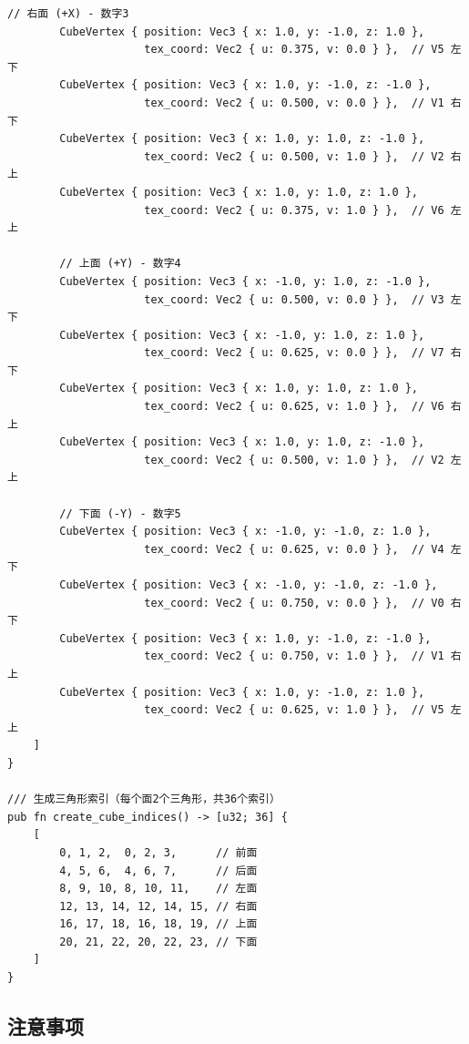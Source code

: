 \documentclass[12pt,a4paper]{article}
\begin{document}
\begin{lstlisting}[style=ruststyle, caption={正方体纹理坐标定义}]
        // 右面 (+X) - 数字3
        CubeVertex { position: Vec3 { x: 1.0, y: -1.0, z: 1.0 }, 
                     tex_coord: Vec2 { u: 0.375, v: 0.0 } },  // V5 左下
        CubeVertex { position: Vec3 { x: 1.0, y: -1.0, z: -1.0 }, 
                     tex_coord: Vec2 { u: 0.500, v: 0.0 } },  // V1 右下
        CubeVertex { position: Vec3 { x: 1.0, y: 1.0, z: -1.0 }, 
                     tex_coord: Vec2 { u: 0.500, v: 1.0 } },  // V2 右上
        CubeVertex { position: Vec3 { x: 1.0, y: 1.0, z: 1.0 }, 
                     tex_coord: Vec2 { u: 0.375, v: 1.0 } },  // V6 左上
        
        // 上面 (+Y) - 数字4
        CubeVertex { position: Vec3 { x: -1.0, y: 1.0, z: -1.0 }, 
                     tex_coord: Vec2 { u: 0.500, v: 0.0 } },  // V3 左下
        CubeVertex { position: Vec3 { x: -1.0, y: 1.0, z: 1.0 }, 
                     tex_coord: Vec2 { u: 0.625, v: 0.0 } },  // V7 右下
        CubeVertex { position: Vec3 { x: 1.0, y: 1.0, z: 1.0 }, 
                     tex_coord: Vec2 { u: 0.625, v: 1.0 } },  // V6 右上
        CubeVertex { position: Vec3 { x: 1.0, y: 1.0, z: -1.0 }, 
                     tex_coord: Vec2 { u: 0.500, v: 1.0 } },  // V2 左上
        
        // 下面 (-Y) - 数字5
        CubeVertex { position: Vec3 { x: -1.0, y: -1.0, z: 1.0 }, 
                     tex_coord: Vec2 { u: 0.625, v: 0.0 } },  // V4 左下
        CubeVertex { position: Vec3 { x: -1.0, y: -1.0, z: -1.0 }, 
                     tex_coord: Vec2 { u: 0.750, v: 0.0 } },  // V0 右下
        CubeVertex { position: Vec3 { x: 1.0, y: -1.0, z: -1.0 }, 
                     tex_coord: Vec2 { u: 0.750, v: 1.0 } },  // V1 右上
        CubeVertex { position: Vec3 { x: 1.0, y: -1.0, z: 1.0 }, 
                     tex_coord: Vec2 { u: 0.625, v: 1.0 } },  // V5 左上
    ]
}

/// 生成三角形索引（每个面2个三角形，共36个索引）
pub fn create_cube_indices() -> [u32; 36] {
    [
        0, 1, 2,  0, 2, 3,      // 前面
        4, 5, 6,  4, 6, 7,      // 后面
        8, 9, 10, 8, 10, 11,    // 左面
        12, 13, 14, 12, 14, 15, // 右面
        16, 17, 18, 16, 18, 19, // 上面
        20, 21, 22, 20, 22, 23, // 下面
    ]
}
\end{lstlisting}

\subsection{注意事项}
\end{document}
